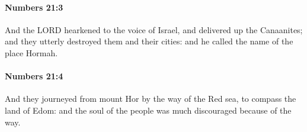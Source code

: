 		\paragraph{Numbers 21:3} %
			\label{NUMBERS-21-3}

			And the LORD hearkened to the voice of Israel, and delivered up the Canaanites; and they utterly destroyed them and their cities: and he called the name of the place Hormah.


		\paragraph{Numbers 21:4} %
			\label{NUMBERS-21-4}

			And they journeyed from mount Hor by the way of the Red sea, to compass the land of Edom: and the soul of the people was much discouraged because of the way.



